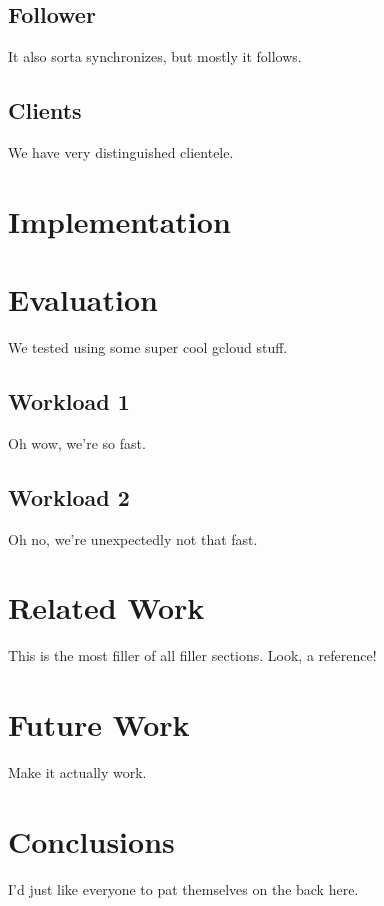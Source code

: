 \documentclass[11pt,english,twocolumn]{article}
\begin{document}
\subsection{Follower}
It also sorta synchronizes, but mostly it follows.

\subsection{Clients}
We have very distinguished clientele.

\section{Implementation}

\section{Evaluation}
We tested using some super cool gcloud stuff.

\subsection{Workload 1}
Oh wow, we're so fast.

\subsection{Workload 2}
Oh no, we're unexpectedly not that fast.

\section{Related Work}
This is the most filler of all filler sections. Look, a reference! \cite{dynamo}

\section{Future Work}
Make it actually work.

\section{Conclusions}
I'd just like everyone to pat themselves on the back here.

 

\end{document}
